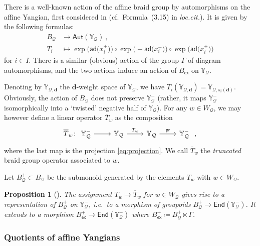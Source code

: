 \documentclass[reqno,a4paper]{amsart}
\newcommand{\Y}{\mathbb{Y}}
\newcommand{\bfd}{\mathbf{d}}
\newcommand{\qv}{\mathcal{Q}}
\newcommand{\sfex}{\mathsf{ex}}
\newcommand{\ad}{\mathsf{ad}}
\newcommand{\Aut}{\mathsf{Aut}}
\newcommand{\End}{\mathsf{End}}
\newcommand{\pr}{\mathsf{pr}}
\theoremstyle{basic-theorem}
\newtheorem{proposition}[theorem]{Proposition}
\numberwithin{equation}{section}
\begin{document}
There is a well-known action of the affine braid group by automorphisms on the affine Yangian, first considered in \cite{GNW18} (cf.\ Formula~(3.15) in \textit{loc.cit.}). It is given by the following formulas:
\begin{align}\label{eq:Ti}
	B_\qv&\longrightarrow \Aut(\Y_\qv) \ , \\
	T_i&\longmapsto \exp\big(\ad\big(x_i^+\big)\big)\circ\exp\big(-\ad\big(x_i^-\big)\big)\circ\exp\big(\ad\big(x_i^+\big)\big)
\end{align}
for $i\in I$. There is a similar (obvious) action of the group $\Gamma$ of diagram automorphisms, and the two actions induce an action of $B_{\sfex}$ on $\Y_\qv$.

Denoting by $\Y_{\qv,\bfd}$ the $\bfd$-weight space of $\Y_{\qv}$, we have $T_i(\Y_{\qv,\bfd})=\Y_{\qv,s_i(\bfd)}$. Obviously, the action of $B_\qv$ does not preserve $\Y^-_\qv$ (rather, it maps $\Y^-_\qv$ isomorphically into a `twisted' negative half of $\Y_\qv$). For any $w\in W_\qv$, we may however define a linear operator $\overline T_w$ as the composition
\begin{align}\label{eq:overlineT}
	\overline T_w\colon
	\begin{tikzcd}[ampersand replacement=\&]
		\Y_\qv^-\arrow{r} \& \Y_\qv\arrow{r}{T_w} \&\Y_\qv\arrow{r}{\pr} \&\Y_\qv^-
	\end{tikzcd}\ ,
\end{align} 
where the last map is the projection \eqref{eq:projection}. We call $\overline T_w$ the \textit{truncated} braid group operator associated to $w$.

Let $B^+_\qv\subset B_\qv$ be the submonoid generated by the elements $T_w$ with $w\in W_\qv$.
\begin{proposition}[{\cite[Propositions~\ref*{COHA-Yangian-prop:truncated-action} and \ref*{COHA-Yangian-prop:truncated-action-affine}]{DPSSV-3}}]
	The assignment $T_w \mapsto \overline T_w$ for $w \in W_\qv$ gives rise to a representation of $B^+_\qv$ on $\Y_\qv^-$, i.e.\ to a morphism of groupoids $B^+_\qv \to \End(\Y_\qv^-)$. It extends to a morphism $B^+_{\sfex} \to \End(\Y_\qv^-)$ where  $B^+_{\sfex} \coloneq B^+_\qv \ltimes \Gamma$.
\end{proposition}

\subsubsection{Quotients of affine Yangians}
\end{document}
